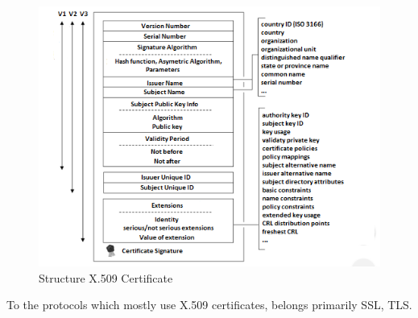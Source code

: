 \documentclass[
  digital, %
  notable,   %
  lof,     %
  lot,     %
]{fithesis3}
\begin{document}

\begin{figure}[th]
	\centering
	\includegraphics[width=1\textwidth]{certificate}
	\caption{Structure X.509 Certificate}
	\label{fig:certificate}
\end{figure}

To the protocols which mostly use X.509 certificates, belongs primarily SSL, TLS.
\end{document}
